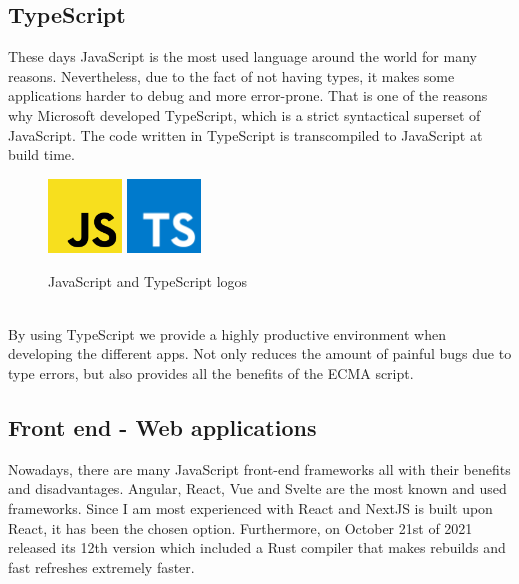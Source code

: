 \documentclass[a4paper, 12pt, oneside]{book}
\begin{document}
\subsection{TypeScript}
These days JavaScript is the most used language around the world for many reasons. Nevertheless, due to the fact of not having types, it makes some applications harder to debug and more error-prone. That is one of the reasons why Microsoft developed TypeScript, which is a strict syntactical superset of JavaScript. The code written in TypeScript is transcompiled to JavaScript at build time.
\\
\begin{figure}[h!]
	\centering
	\includegraphics[width=0.175\textwidth]{assets/js-logo.png}
	\includegraphics[width=0.175\textwidth]{assets/ts-logo.png}
	\caption{JavaScript and TypeScript logos}
\end{figure}
\\
By using TypeScript we provide a highly productive environment when developing the different apps. Not only reduces the amount of painful bugs due to type errors, but also provides all the benefits of the ECMA script.
\subsection{Front end - Web applications}
Nowadays, there are many JavaScript front-end frameworks all with their benefits and disadvantages. Angular, React, Vue and Svelte are the most known and used frameworks. Since I am most experienced with React and NextJS is built upon React, it has been the chosen option. Furthermore, on October 21st of 2021 released its 12th version which included a Rust compiler that makes rebuilds and fast refreshes extremely faster.
\end{document}
